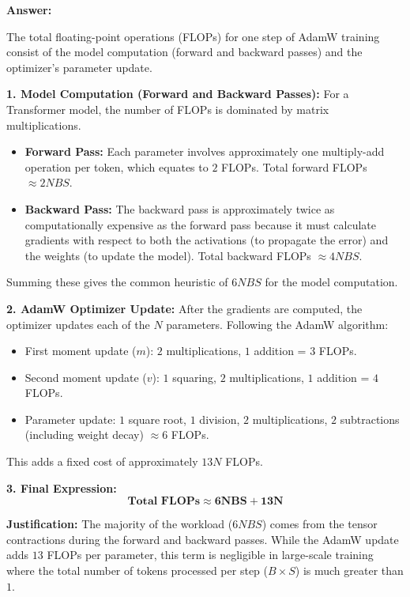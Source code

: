 \begin{answerbox}
    \textbf{Answer:}

    The total floating-point operations (FLOPs) for one step of AdamW training consist of the model computation (forward and backward passes) and the optimizer's parameter update.

    \textbf{1. Model Computation (Forward and Backward Passes):}
    For a Transformer model, the number of FLOPs is dominated by matrix multiplications.
    \begin{itemize}
        \item \textbf{Forward Pass:} Each parameter involves approximately one multiply-add operation per token, which equates to $2$ FLOPs. Total forward FLOPs $\approx 2NBS$.
        \item \textbf{Backward Pass:} The backward pass is approximately twice as computationally expensive as the forward pass because it must calculate gradients with respect to both the activations (to propagate the error) and the weights (to update the model). Total backward FLOPs $\approx 4NBS$.
    \end{itemize}
    Summing these gives the common heuristic of \textbf{$6NBS$} for the model computation.

    \textbf{2. AdamW Optimizer Update:}
    After the gradients are computed, the optimizer updates each of the $N$ parameters. Following the AdamW algorithm:
    \begin{itemize}
        \item First moment update ($m$): $2$ multiplications, $1$ addition = $3$ FLOPs.
        \item Second moment update ($v$): $1$ squaring, $2$ multiplications, $1$ addition = $4$ FLOPs.
        \item Parameter update: $1$ square root, $1$ division, $2$ multiplications, $2$ subtractions (including weight decay) $\approx 6$ FLOPs.
    \end{itemize}
    This adds a fixed cost of approximately \textbf{$13N$} FLOPs.

    \textbf{3. Final Expression:}
    $$ \mathbf{\textbf{Total FLOPs} \approx 6NBS + 13N} $$

    \textbf{Justification:}
    The majority of the workload ($6NBS$) comes from the tensor contractions during the forward and backward passes. While the AdamW update adds $13$ FLOPs per parameter, this term is negligible in large-scale training where the total number of tokens processed per step ($B \times S$) is much greater than $1$.

\end{answerbox}

